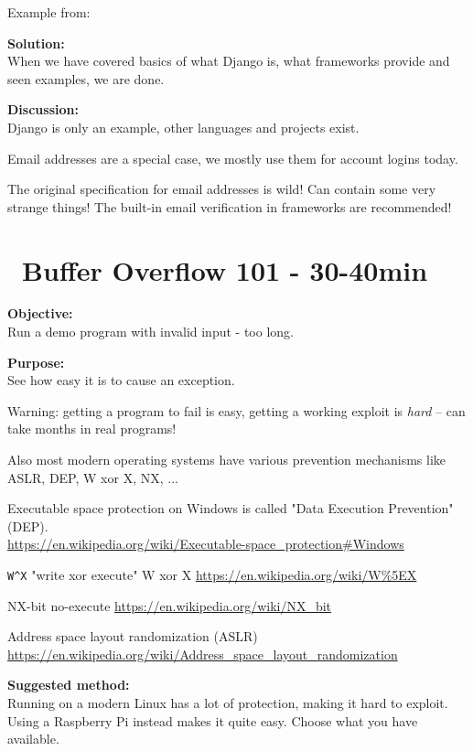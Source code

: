 \documentclass[a4paper,11pt,notitlepage]{report}
\begin{document}
Example from:

{\bf Solution:}\\
When we have covered basics of what Django is, what frameworks provide and seen examples, we are done.

{\bf Discussion:}\\
Django is only an example, other languages and projects exist.

Email addresses are a special case, we mostly use them for account logins today.

The original specification for email addresses is wild! Can contain some very strange things! The built-in email verification in frameworks are recommended!



\chapter{\faInfoCircle\ Buffer Overflow 101 - 30-40min}
\label{ex:bufferoverflow}


{\bf Objective:}\\
Run a demo program with invalid input - too long.

{\bf Purpose:}\\
See how easy it is to cause an exception.

Warning: getting a program to fail is easy, getting a working exploit is \emph{hard} -- can take months in real programs!

Also most modern operating systems have various prevention mechanisms like ASLR, DEP, W xor X, NX, ...

\begin{list2}
\item Executable space protection on Windows is called "Data Execution Prevention" (DEP).\\
\url{https://en.wikipedia.org/wiki/Executable-space_protection#Windows}
\item \verb+W^X+ "write xor execute" W xor X \url{https://en.wikipedia.org/wiki/W%5EX}
\item NX-bit no-execute \url{https://en.wikipedia.org/wiki/NX_bit}
\item Address space layout randomization (ASLR) \url{https://en.wikipedia.org/wiki/Address_space_layout_randomization}
\end{list2}

{\bf Suggested method:}\\
Running on a modern Linux has a lot of protection, making it hard to exploit. Using a Raspberry Pi instead makes it quite easy. Choose what you have available.
\end{document}
